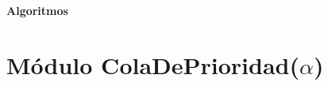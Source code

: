 \documentclass[a4paper,10pt]{article}
\newenvironment{Algoritmos}{%
  \vspace*{2ex}%
  \noindent\textbf{\Large Algoritmos}%
  \vspace*{2ex}%
}{}
\begin{document}
\begin{Algoritmos}
  
   
    \end{Algoritmos}
    
    
    
    


\newpage
\section{Módulo ColaDePrioridad($\alpha$)}
\end{document}

